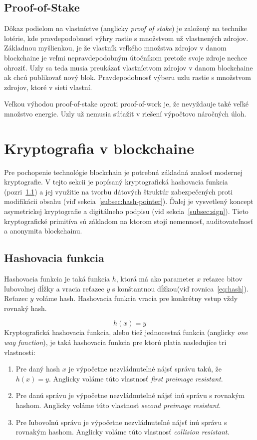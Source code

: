 \subsection{Proof-of-Stake}\label{subsec:pos}

Dôkaz podielom na vlastníctve (anglicky \textit{proof of stake}) je založený na technike lotérie, kde pravdepodobnosť výhry rastie s množstvom už vlastnených zdrojov. Základnou myšlienkou, je že vlastník veľkého množstva zdrojov v danom blockchaine je veľmi nepravdepodobným útočníkom pretože svoje zdroje nechce ohroziť. Uzly sa teda musia preukázať vlastníctvom zdrojov v danom blockchaine ak chcú publikovať nový blok. Pravdepodobnosť výberu uzlu rastie s množstvom zdrojov, ktoré v sieti vlastní.~\cite{homoliakBlockchain, nguyenPos}

Veľkou výhodou proof-of-stake oproti proof-of-work je, že nevyždauje také veľké množstvo energie. Uzly už nemusia súťažiť v riešení výpočtovo náročných úloh. ~\cite{leporeConsensus}

\section{Kryptografia v blockchaine}\label{sec:crypto}
Pre pochopenie technológie blockchain je potrebná základná znalosť modernej kryptografie. V tejto sekcii je popísaný kryptografická hashovacia funkcia (pozri~\ref{subsec:hash}) a jej využitie na tvorbu dátových štruktúr zabezpečených proti modifikácii obsahu (viď sekcia~\ref{subsec:hash-pointer}). Ďalej je vysvetlený koncept asymetrickej kryptografie a digitálneho podpisu (viď sekcia~\ref{subsec:sign}). Tieto kryptografické primitíva sú základom na ktorom stojí nemennosť, auditovateľnosť a anonymita blockchainu.

\subsection{Hashovacia funkcia}\label{subsec:hash}
Hashovacia funkcia je taká funkcia $h$, ktorá má ako parameter $x$ reťazec bitov ľubovolnej dĺžky a vracia reťazec $y$ s konštantnou dĺžkou(viď rovnica~\ref{eq:hash}). Reťazec $y$ voláme hash. Hashovacia funkcia vracia pre konkrétny vstup vždy rovnaký hash.

\begin{equation} \label{eq:hash}
	h(x) = y
\end{equation}
Kryptografická hashovacia funkcia, alebo tiež jednocestná funkcia (anglicky \textit{one way function}), je taká hashovacia funkcia pre ktorú platia nasledujíce tri vlastnosti:
\begin{enumerate}
	\item Pre daný hash $x$ je výpočetne nezvládnuteľné nájsť správu takú, že $ h(x) = y $. Anglicky voláme túto vlastnosť \textit{first preimage resistant}.
	\item Pre danú správu je výpočetne nezvládnuteľné nájsť inú správu s rovnakým hashom. Anglicky voláme túto vlastnosť \textit{second preimage resistant}.
	\item Pre ľubovoľnú správu je výpočetne nezvládnuteľné nájsť inú správu s rovnakým hashom. Anglicky voláme túto vlastnosť \textit{collision resistant}.
\end{enumerate}


